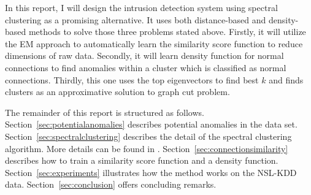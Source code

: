 In this report, I will design the intrusion detection system using spectral clustering as a promising alternative. 
It uses both distance-based and density-based methods to solve those three problems stated above. 
Firstly, it will utilize the EM approach to automatically learn the similarity score function to reduce dimensions of raw data.
Secondly, it will learn density function for normal connections to find anomalies within a cluster which is classified as normal connections. 
Thirdly, this one uses the top eigenvectors to find best $k$ and finds clusters as an approximative solution to graph cut problem. %

The remainder of this report is structured as follows. 
Section~\ref{sec:potentialanomalies} describes potential anomalies in the data set. 
Section~\ref{sec:spectralclustering} describes the detail of the spectral clustering algorithm. 
More details can be found in \cite{ulrike07}. 
Section~\ref{sec:connectionsimilarity} describes how to train a similarity score function and a density function. 
Section~\ref{sec:experiments} illustrates how the method works on the NSL-KDD data. 
Section~\ref{sec:conclusion} offers concluding remarks. 

